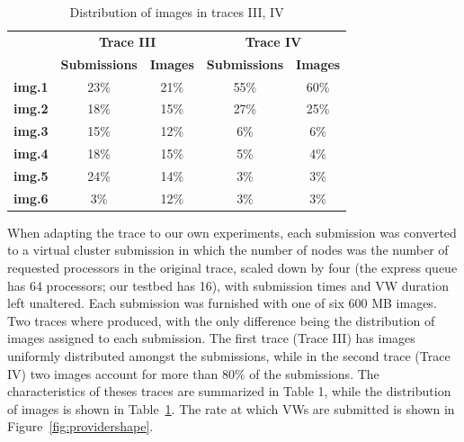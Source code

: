 \documentclass[singlespace]{ccw_chithesis}
\begin{document}
\begin{table}
\begin{center}
\begin{tabular}{|c|c|c|c|c|}
\cline{2-5}
\multicolumn{1}{c|}{} &
\multicolumn{2}{c|}{\bfseries Trace III} &
\multicolumn{2}{c|}{\bfseries Trace IV}

\\\cline{2-5}

\multicolumn{1}{c|}{}  & {\bfseries Submissions} & {\bfseries Images} & {\bfseries Submissions} & {\bfseries Images} 

\\\hline

{\bfseries img.1} & 23\% & 21\% & 55\% & 60\%

\\\hline

{\bfseries img.2}
&
18\%
&
15\%
&
27\%
&
25\%

\\\hline

{\bfseries img.3}

&
15\%
&
12\%
&
6\%
&
6\%

\\\hline

{\bfseries img.4}
&
18\% 
&
15\%
&
5\%
&
4\%

\\\hline

{\bfseries img.5}
&
24\%
&
14\%
&
3\%
&
3\%

\\\hline

{\bfseries img.6}
&
3\%
&
12\%
&
3\%
&
3\%

\\\hline
\end{tabular}

\caption{Distribution of images in traces III, IV}
\label{tab:imagedistro}
\end{center}
\end{table}

When adapting the trace to our own experiments, each submission was
converted to a virtual cluster submission in which the number of nodes
was the number of requested processors in the original trace, scaled
down by four (the express queue has 64 processors; our testbed has 16),
with submission times and VW duration left unaltered. Each submission
was furnished with one of six 600 MB images. Two traces where produced,
with the only difference being the distribution of images assigned to
each submission. The first trace (Trace III) has images uniformly
distributed amongst the submissions, while in the second trace (Trace
IV) two images account for more than 80\% of the submissions. The
characteristics of theses traces are summarized in Table 1, while the
distribution of images is shown in Table~\ref{tab:imagedistro}. The rate at which VWs are
submitted is shown in Figure~\ref{fig:providershape}.
\end{document}
